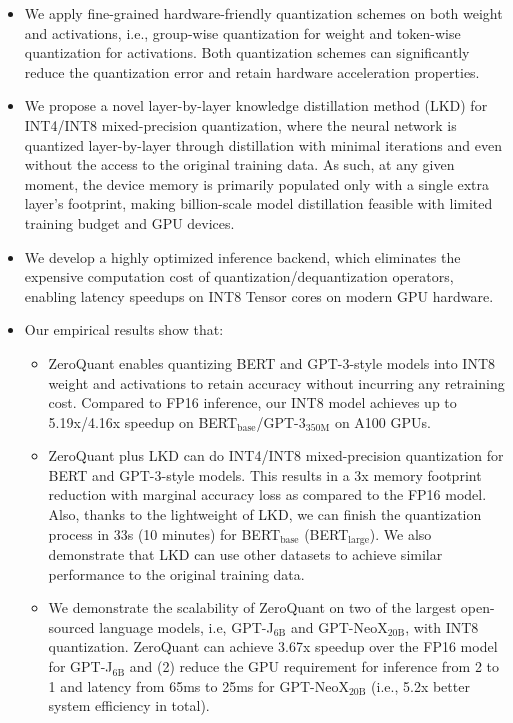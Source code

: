 \begin{itemize}[noitemsep, nolistsep, labelindent=0pt, leftmargin=*]
    \item We apply fine-grained hardware-friendly quantization schemes on both weight and activations, i.e., group-wise quantization for weight and token-wise quantization for activations. Both quantization schemes can significantly reduce the quantization error and retain hardware acceleration properties.
    \item We propose a novel layer-by-layer knowledge distillation method (LKD) for INT4/INT8 mixed-precision quantization, where the neural network is quantized layer-by-layer through distillation with minimal iterations and even without the access to the original training data. As such, at any given moment, the device memory is primarily populated only with a single extra layer's footprint, making billion-scale model distillation feasible with limited training budget and GPU devices.
    \item We develop a highly optimized inference backend, which eliminates the expensive computation cost of quantization/dequantization operators, enabling latency speedups on INT8 Tensor cores on modern GPU hardware. 
    \item Our empirical results show that:
        \begin{itemize}[noitemsep, nolistsep, labelindent=0pt, leftmargin=*]
            \item ZeroQuant enables quantizing BERT and GPT-3-style models into INT8 weight and activations to retain accuracy without incurring any retraining cost. Compared to FP16 inference, our INT8 model achieves up to 5.19x/4.16x speedup on BERT$_\text{base}$/GPT-3$_{\text{350M}}$ on A100 GPUs.
            \item ZeroQuant plus LKD can do INT4/INT8 mixed-precision quantization for BERT and GPT-3-style models. This results in a 3x memory footprint reduction with marginal accuracy loss as compared to the FP16 model. Also, thanks to the lightweight of LKD, we can finish the quantization process in 33s (10 minutes) for BERT$_\text{base}$ (BERT$_{\text{large}}$). 
            We also demonstrate that LKD can use other datasets to achieve similar performance to the original training data.
            \item We demonstrate the scalability of ZeroQuant on two of the largest open-sourced language models, i.e, GPT-J$_{\text{6B}}$ and GPT-NeoX$_{\text{20B}}$, with INT8 quantization. ZeroQuant can achieve 3.67x speedup over the FP16 model for GPT-J$_{\text{6B}}$ and (2) reduce the GPU requirement for inference from 2 to 1 and latency from 65ms to 25ms for GPT-NeoX$_{\text{20B}}$ (i.e., 5.2x better system efficiency in total).
        \end{itemize}
\end{itemize}


